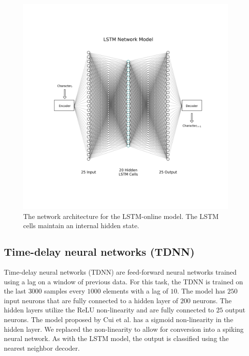 \documentclass{article}
\begin{document}
\begin{figure}[!h]
    \centering
    \includegraphics[width=0.9\linewidth]{../diagrams/lstm.png}
    \caption{The network architecture for the LSTM-online model. The LSTM cells maintain an internal hidden state.}
    \label{fig:lstm-online-model}
\end{figure}

\subsection*{Time-delay neural networks (TDNN)}

Time-delay neural networks (TDNN) are feed-forward neural networks trained using a lag on a window of previous data. \cite{waibel1995phoneme} For this task, the TDNN is trained on the last $3000$ samples every $1000$ elements with a lag of $10$. \cite{rojas1996backpropagation} The model has $250$ input neurons that are fully connected to a hidden layer of $200$ neurons. The hidden layers utilize the ReLU non-linearity and are fully connected to $25$ output neurons. The model proposed by Cui et al. has a sigmoid non-linearity in the hidden layer. We replaced the non-linearity to allow for conversion into a spiking neural network. As with the LSTM model, the output is classified using the nearest neighbor decoder.
\end{document}
